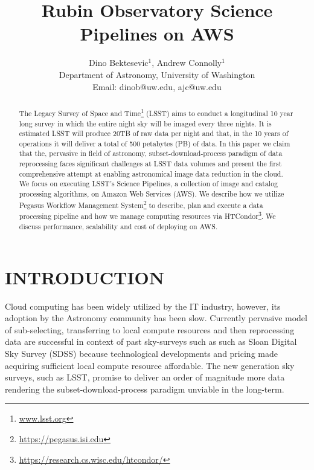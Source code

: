 \documentclass[a4paper, 10pt, conference]{ieeeconf}
\title{\LARGE \bf
Rubin Observatory Science Pipelines on AWS
}
\author{
    Dino Bektesevic$^1$, Andrew Connolly$^1$ \\
    Department of Astronomy, University of Washington \\ Email: dinob@uw.edu, ajc@uw.edu
    }
\begin{document}
\maketitle


\begin{abstract}

The Legacy Survey of Space and Time\footnote{\url{www.lsst.org}} (LSST) aims to conduct a longitudinal 10 year long survey in which the entire night sky will be imaged every three nights. It is estimated LSST will produce 20TB of raw data per night and that, in the 10 years of operations it will deliver a total of 500 petabytes (PB) of data. In this paper we claim that the, pervasive in field of astronomy, subset-download-process paradigm of data reprocessing faces significant challenges at LSST data volumes and present the first comprehensive attempt at enabling astronomical image data reduction in the cloud. We focus on executing LSST's Science Pipelines, a collection of image and catalog processing algorithms, on Amazon Web Services (AWS). We describe how we utilize Pegasus Workflow Management System\footnote{\url{https://pegasus.isi.edu}} to describe, plan and execute a data processing pipeline and how we manage computing resources via HTCondor\footnote{\url{https://research.cs.wisc.edu/htcondor/}}. We discuss performance, scalability and cost of deploying on AWS.
\end{abstract}

\section{INTRODUCTION}

Cloud computing has been widely utilized by the IT industry, however, its adoption by the Astronomy community has been slow. Currently pervasive model of sub-selecting, transferring to local compute resources and then reprocessing data are successful in context of past sky-surveys such as such as Sloan Digital Sky Survey\cite{York2000} (SDSS) because technological developments and pricing made acquiring sufficient local compute resource affordable. The new generation sky surveys, such as LSST, promise to deliver an order of magnitude more data rendering the subset-download-process paradigm unviable in the long-term. 
\end{document}
